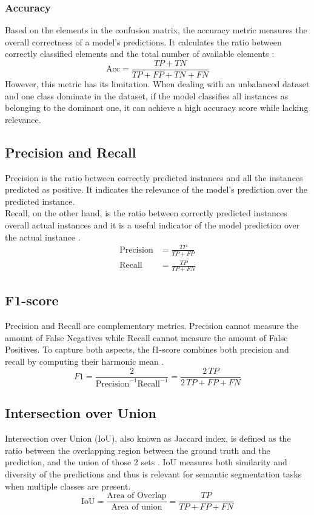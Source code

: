 \subsubsection{Accuracy}
Based on the elements in the confusion matrix, the accuracy metric measures the overall correctness of a model's predictions. It calculates the ratio between correctly classified elements and the total number of available elements \cite{eval_metrics}:
\begin{equation}
    \text{Acc} = \frac{TP + TN}{TP + FP + TN + FN}
\end{equation}
However, this metric has its limitation. When dealing with an unbalanced dataset and one class dominate in the dataset, if the model classifies all instances as belonging to the dominant one, it can achieve a high accuracy score while lacking relevance.

\subsection{Precision and Recall}
Precision is the ratio between correctly predicted instances and all the instances predicted as positive. It indicates the relevance of the model's prediction over the predicted instance.\\
Recall, on the other hand, is the ratio between correctly predicted instances overall actual instances and it is a useful indicator of the model prediction over the actual instance \cite{eval_metrics}.
\begin{align}
    \text{Precision} &= \frac{TP}{TP + FP}\\
    \text{Recall}    &= \frac{TP}{TP + FN}
\end{align}

\subsection{F1-score}
Precision and Recall are complementary metrics. Precision cannot measure the amount of False Negatives while Recall cannot measure the amount of False Positives. To capture both aspects, the f1-score combines both precision and recall by computing their harmonic mean \cite{eval_metrics}.
\begin{equation}
    F1 = \frac{2}{\text{Precision}^{-1} \text{Recall}^{-1}} = \frac{2 \, TP}{2 \, TP + FP + FN}
\end{equation}

\subsection{Intersection over Union}
Intersection over Union (IoU), also known as Jaccard index, is defined as the ratio between the overlapping region between the ground truth and the prediction, and the union of those 2 sets \cite{iou}. IoU measures both similarity and diversity of the predictions and thus is relevant for semantic segmentation tasks when multiple classes are present.
\begin{equation}
    \text{IoU} = \frac{\text{Area of Overlap}}{\text{Area of union}} = \frac{TP}{TP+FP+FN}
\end{equation}

